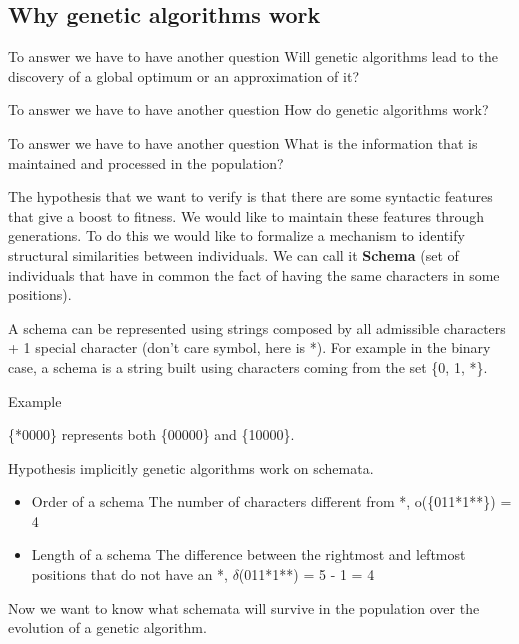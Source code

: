 \subsection{Why genetic algorithms work}

To answer we have to have another question \ra Will genetic algorithms lead to the discovery of a global optimum or an approximation of it?

To answer we have to have another question \ra How do genetic algorithms work?

To answer we have to have another question \ra What is the information that is maintained and processed in the population?

\vspace{10pt}

The hypothesis that we want to verify is that there are some syntactic features that give a boost to fitness. We would like to maintain these features through generations. To do this we would like to formalize a mechanism to identify structural similarities between individuals. We can call it \textbf{Schema} (set of individuals that have in common the fact of having the same characters in some positions). 

\vspace{10pt}
A schema can be represented using strings composed by all admissible characters + 1 special character (don't care symbol, here is *). For example in the binary case, a schema is a string built using characters coming from the set \{0, 1, *\}.

\vspace{10pt}
Example

\{*0000\} represents both \{00000\} and \{10000\}.

\vspace{10pt}

Hypothesis \ra implicitly genetic algorithms work on schemata. 

\vspace{10pt}

\begin{itemize}
    \item Order of a schema \ra The number of characters different from *, o(\{011*1**\}) = 4
    \item Length of a schema \ra The difference between the rightmost and leftmost positions that do not have an *, $\delta$(011*1**) = 5 - 1 = 4
\end{itemize}

Now we want to know what schemata will survive in the population over the evolution of a genetic algorithm. 


